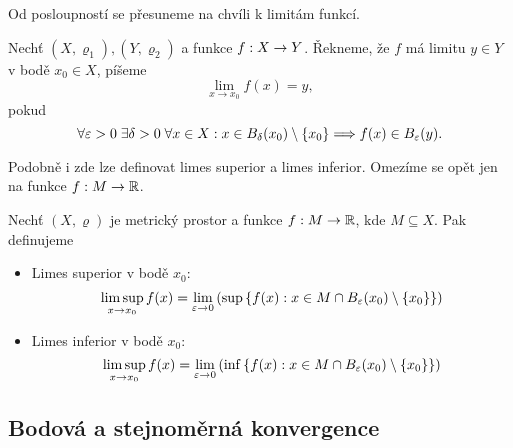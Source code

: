 Od posloupností se přesuneme na chvíli k limitám funkcí.
\begin{definition}\label{def:limita-fce-v-bode}
    Nechť $(X,\varrho_1),(Y,\varrho_2)$ a funkce $f:X \rightarrow Y$. Řekneme, že $f$ má limitu $y\in Y$ v bodě $x_0\in X$, píšeme
    \[\lim_{x\to x_0}f(x)=y,\]
    pokud
    \[\forall \varepsilon >0\;\exists \delta >0\;\forall x\in X: x\in B_\delta(x_0)\setminus\left\{x_0\right\}\Longrightarrow f(x)\in B_\varepsilon(y).\]
\end{definition}
Podobně i zde lze definovat limes superior a limes inferior. Omezíme se opět jen na funkce $f:M \rightarrow \mathbb{R}$.
\begin{definition}\label{def:limsup-liminf-funkce}
    Nechť $(X,\varrho)$ je metrický prostor a funkce $f:M \rightarrow \mathbb{R}$, kde $M\subseteq X$. Pak definujeme
    \begin{itemize}
        \item Limes superior v bodě $x_0$:
        \[\limsup _{x\to x_0}f(x)=\lim _{\varepsilon \to 0}\left(\sup\left\{f(x):x\in M\cap B_\varepsilon(x_0)\setminus \{x_0\}\right\}\right)\]
        \item Limes inferior v bodě $x_0$:
        \[\limsup _{x\to x_0}f(x)=\lim _{\varepsilon \to 0}\left(\inf\left\{f(x):x\in M\cap B_\varepsilon(x_0)\setminus \{x_0\}\right\}\right)\]
    \end{itemize}
\end{definition}

\subsection{Bodová a stejnoměrná konvergence}\label{subsec:bodova-stejnomerna-konvergence}

